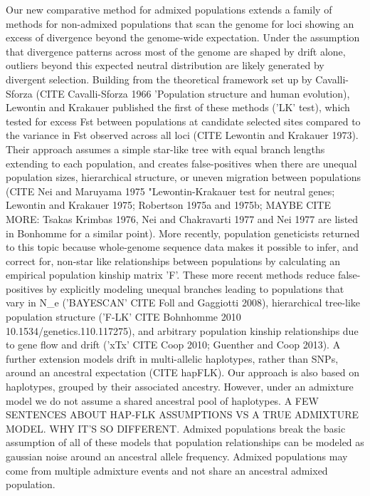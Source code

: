 \documentclass[12pt]{report}
\begin{document}
Our new comparative method for admixed populations extends a family of methods for non-admixed populations that scan the genome for loci showing an excess of divergence beyond the genome-wide expectation. Under the assumption that divergence patterns across most of the genome are shaped by drift alone, outliers beyond this expected neutral distribution are likely generated by divergent selection. Building from the theoretical framework set up by Cavalli-Sforza (CITE Cavalli-Sforza 1966 'Population structure and human evolution), Lewontin and Krakauer published the first of these methods ('LK' test), which tested for excess Fst between populations at candidate selected sites compared to the variance in Fst observed across all loci (CITE Lewontin and Krakauer 1973). Their approach assumes a simple star-like tree with equal branch lengths extending to each population, and creates false-positives when there are unequal population sizes, hierarchical structure, or uneven migration between populations (CITE Nei and Maruyama 1975 "Lewontin-Krakauer test for neutral genes; Lewontin and Krakauer 1975; Robertson 1975a and 1975b; MAYBE CITE MORE: Tsakas Krimbas 1976, Nei and Chakravarti 1977 and Nei 1977 are listed in Bonhomme for a similar point). More recently, population geneticists returned to this topic because whole-genome sequence data makes it possible to infer, and correct for, non-star like relationships between populations by calculating an empirical population kinship matrix 'F'. 
These more recent methods reduce false-positives by explicitly modeling unequal branches leading to populations that vary in N_{e} ('BAYESCAN' CITE Foll and Gaggiotti 2008), hierarchical tree-like population structure ('F-LK' CITE Bohnhomme 2010 10.1534/genetics.110.117275), and arbitrary population kinship relationships due to gene flow and drift ('xTx' CITE Coop 2010;  Guenther and Coop 2013). A further extension models drift in multi-allelic haplotypes, rather than SNPs, around an ancestral expectation (CITE hapFLK). Our approach is also based on haplotypes, grouped by their associated ancestry. However, under an admixture model we do not assume a shared ancestral pool of haplotypes.
A FEW SENTENCES ABOUT HAP-FLK ASSUMPTIONS VS A TRUE ADMIXTURE MODEL. WHY IT'S SO DIFFERENT.
Admixed populations break the basic assumption of all of these models that population relationships can be modeled as gaussian noise around an ancestral allele frequency. Admixed populations may come from multiple admixture events and not share an ancestral admixed population. 
\end{document}

